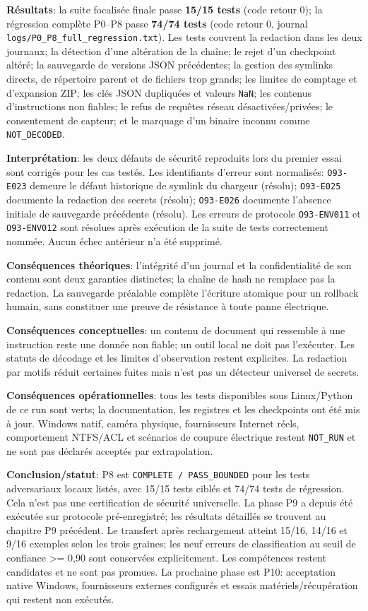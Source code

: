 \documentclass[11pt,a4paper,oneside]{report}
\begin{document}
\textbf{Résultats}: la suite focalisée finale passe \textbf{15/15 tests} (code retour 0); la régression complète P0--P8 passe \textbf{74/74 tests} (code retour 0, journal \texttt{logs/P0\_P8\_full\_regression.txt}). Les tests couvrent la redaction dans les deux journaux; la détection d’une altération de la chaîne; le rejet d’un checkpoint altéré; la sauvegarde de versions JSON précédentes; la gestion des symlinks directs, de répertoire parent et de fichiers trop grands; les limites de comptage et d’expansion ZIP; les clés JSON dupliquées et valeurs \texttt{NaN}; les contenus d’instructions non fiables; le refus de requêtes réseau désactivées/privées; le consentement de capteur; et le marquage d’un binaire inconnu comme \texttt{NOT\_DECODED}.

\textbf{Interprétation}: les deux défauts de sécurité reproduits lors du premier essai sont corrigés pour les cas testés. Les identifiants d’erreur sont normalisés: \texttt{O93-E023} demeure le défaut historique de symlink du chargeur (résolu); \texttt{O93-E025} documente la redaction des secrets (résolu); \texttt{O93-E026} documente l’absence initiale de sauvegarde précédente (résolu). Les erreurs de protocole \texttt{O93-ENV011} et \texttt{O93-ENV012} sont résolues après exécution de la suite de tests correctement nommée. Aucun échec antérieur n’a été supprimé.

\textbf{Conséquences théoriques}: l’intégrité d’un journal et la confidentialité de son contenu sont deux garanties distinctes; la chaîne de hash ne remplace pas la redaction. La sauvegarde préalable complète l’écriture atomique pour un rollback humain, sans constituer une preuve de résistance à toute panne électrique.

\textbf{Conséquences conceptuelles}: un contenu de document qui ressemble à une instruction reste une donnée non fiable; un outil local ne doit pas l’exécuter. Les statuts de décodage et les limites d’observation restent explicites. La redaction par motifs réduit certaines fuites mais n’est pas un détecteur universel de secrets.

\textbf{Conséquences opérationnelles}: tous les tests disponibles sous Linux/Python de ce run sont verts; la documentation, les registres et les checkpoints ont été mis à jour. Windows natif, caméra physique, fournisseurs Internet réels, comportement NTFS/ACL et scénarios de coupure électrique restent \texttt{NOT\_RUN} et ne sont pas déclarés acceptés par extrapolation.

\textbf{Conclusion/statut}: P8 est \texttt{COMPLETE / PASS\_BOUNDED} pour les tests adversariaux locaux listés, avec 15/15 tests ciblés et 74/74 tests de régression. Cela n’est pas une certification de sécurité universelle. La phase P9 a depuis été exécutée sur protocole pré-enregistré; les résultats détaillés se trouvent au chapitre P9 précédent. Le transfert après rechargement atteint 15/16, 14/16 et 9/16 exemples selon les trois graines; les neuf erreurs de classification au seuil de confiance >= 0,90 sont conservées explicitement. Les compétences restent candidates et ne sont pas promues. La prochaine phase est P10: acceptation native Windows, fournisseurs externes configurés et essais matériels/récupération qui restent non exécutés.
\end{document}
